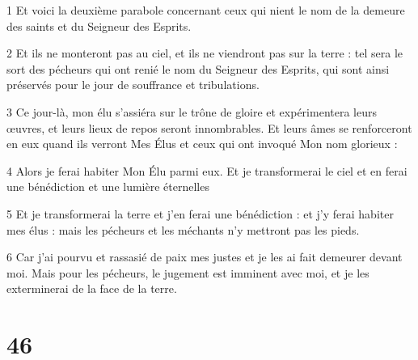 \par 1 Et voici la deuxième parabole concernant ceux qui nient le nom de la demeure des saints et du Seigneur des Esprits.
\par 2 Et ils ne monteront pas au ciel, et ils ne viendront pas sur la terre : tel sera le sort des pécheurs qui ont renié le nom du Seigneur des Esprits, qui sont ainsi préservés pour le jour de souffrance et tribulations.
\par 3 Ce jour-là, mon élu s'assiéra sur le trône de gloire et expérimentera leurs œuvres, et leurs lieux de repos seront innombrables. Et leurs âmes se renforceront en eux quand ils verront Mes Élus et ceux qui ont invoqué Mon nom glorieux :
\par 4 Alors je ferai habiter Mon Élu parmi eux. Et je transformerai le ciel et en ferai une bénédiction et une lumière éternelles
\par 5 Et je transformerai la terre et j'en ferai une bénédiction : et j'y ferai habiter mes élus : mais les pécheurs et les méchants n'y mettront pas les pieds.
\par 6 Car j'ai pourvu et rassasié de paix mes justes et je les ai fait demeurer devant moi. Mais pour les pécheurs, le jugement est imminent avec moi, et je les exterminerai de la face de la terre.

\chapter{46}

